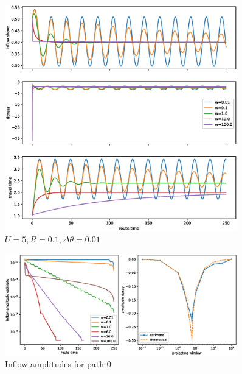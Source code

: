 \documentclass[12pt]{article}
\begin{document}
\begin{figure}
	\includegraphics[width=0.9\textwidth]{img/replicator_proj_tt.eps}
	\caption{ $ U = 5, R=0.1, \Delta \theta = 0.01$}
	\label{fig:fluctuations_proj}

\end{figure}
	
\begin{figure}
	\includegraphics[width=0.9\textwidth]{img/amplitudes_proj_tt.eps}
	\caption{ Inflow amplitudes for path 0 }
	\label{fig:amplitudes_proj}

\end{figure}
\end{document}
